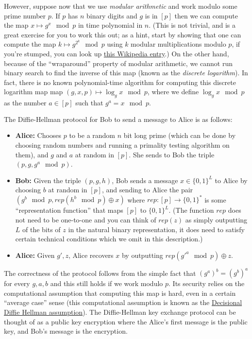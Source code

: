 However, suppose now that we use \emph{modular arithmetic} and work
modulo some prime number \(p\). If \(p\) has \(n\) binary digits and
\(g\) is in \([p]\) then we can compute the map \(x \mapsto g^x \mod p\)
in time polynomial in \(n\). (This is not trivial, and is a great
exercise for you to work this out; as a hint, start by showing that one
can compute the map \(k \mapsto g^{2^k} \mod p\) using \(k\) modular
multiplications modulo \(p\), if you're stumped, you can look up
\href{https://en.wikipedia.org/wiki/Exponentiation_by_squaring}{this
Wikipedia entry}.) On the other hand, because of the ``wraparound''
property of modular arithmetic, we cannot run binary search to find the
inverse of this map (known as the \emph{discrete logarithm}). In fact,
there is no known polynomial-time algorithm for computing this discrete
logarithm map map \((g,x,p) \mapsto \log_g x \mod p\), where we define
\(\log_g x \mod p\) as the number \(a \in [p]\) such that
\(g^a = x \mod p\).

The Diffie-Hellman protocol for Bob to send a message to Alice is as
follows:

\begin{itemize}
\item
  \textbf{Alice:} Chooses \(p\) to be a random \(n\) bit long prime
  (which can be done by choosing random numbers and running a primality
  testing algorithm on them), and \(g\) and \(a\) at random in \([p]\).
  She sends to Bob the triple \((p,g,g^a \mod p)\).
\item
  \textbf{Bob:} Given the triple \((p,g,h)\), Bob sends a message
  \(x \in \{0,1\}^L\) to Alice by choosing \(b\) at random in \([p]\),
  and sending to Alice the pair
  \((g^b \mod p, rep(h^b \mod p) \oplus x)\) where
  \(rep:[p] \rightarrow \{0,1\}^*\) is some ``representation function''
  that maps \([p]\) to \(\{0,1\}^L\). (The function \(rep\) does not
  need to be one-to-one and you can think of \(rep(z)\) as simply
  outputting \(L\) of the bits of \(z\) in the natural binary
  representation, it does need to satisfy certain technical conditions
  which we omit in this description.)
\item
  \textbf{Alice:} Given \(g',z\), Alice recovers \(x\) by outputting
  \(rep(g'^a \mod p) \oplus z\).
\end{itemize}

The correctness of the protocol follows from the simple fact that
\((g^a)^b = (g^b)^a\) for every \(g,a,b\) and this still holds if we
work modulo \(p\). Its security relies on the computational assumption
that computing this map is hard, even in a certain ``average case''
sense (this computational assumption is known as the
\href{https://en.wikipedia.org/wiki/Decisional_Diffie\%E2\%80\%93Hellman_assumption}{Decisional
Diffie Hellman assumption}). The Diffie-Hellman key exchange protocol
can be thought of as a public key encryption where the Alice's first
message is the public key, and Bob's message is the encryption.

